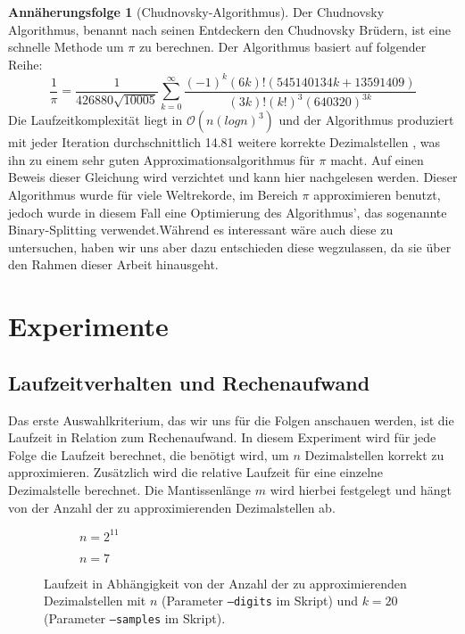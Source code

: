 \documentclass{scrartcl}
\theoremstyle{definition}
\newtheorem{approximation sequence}{Annäherungsfolge}
\begin{document}
\begin{approximation sequence}[Chudnovsky-Algorithmus]
Der Chudnovsky Algorithmus, benannt nach seinen Entdeckern den Chudnovsky
Brüdern, ist eine schnelle Methode um \(\pi\) zu berechnen. Der Algorithmus
basiert auf folgender Reihe\cite{Chudnovsky}:
\[\frac{1}{\pi} = \frac{1}{426880\sqrt{10005}}\sum_{k = 0}^{\infty}\frac{(-1)^k(6k)!(545140134k+13591409)}{(3k)!(k!)^3(640320)^{3k}}\]
Die Laufzeitkomplexität liegt in \(\mathcal{O}(n(logn)^3)\)
  \cite{Runtime-Chudnovsky} und der Algorithmus produziert mit jeder Iteration
  durchschnittlich 14.81 weitere korrekte Dezimalstellen
  \cite{Nachkommastellen-Chudnovsky}, was ihn zu einem sehr guten
  Approximationsalgorithmus für \(\pi\) macht. Auf einen Beweis dieser
  Gleichung wird verzichtet und kann hier \cite{Chudnovsky-Proof} nachgelesen
  werden. Dieser Algorithmus wurde für viele Weltrekorde, im Bereich \(\pi\)
  approximieren benutzt, jedoch wurde in diesem Fall eine Optimierung des
  Algorithmus', das sogenannte Binary-Splitting
  verwendet\cite{Chudnovsky}.Während es interessant wäre auch diese zu
  untersuchen, haben wir uns aber dazu entschieden diese wegzulassen, da sie
  über den Rahmen dieser Arbeit hinausgeht.

\end{approximation sequence}

\pagebreak

\section{Experimente}

\subsection{Laufzeitverhalten und Rechenaufwand}

Das erste Auswahlkriterium, das wir uns für die Folgen anschauen werden, ist
die Laufzeit in Relation zum Rechenaufwand. In diesem Experiment wird für jede
Folge die Laufzeit berechnet, die benötigt wird, um \(n\) Dezimalstellen
korrekt zu approximieren. Zusätzlich wird die relative Laufzeit für eine
einzelne Dezimalstelle berechnet. Die Mantissenlänge \(m\) wird hierbei
festgelegt und hängt von der Anzahl der zu approximierenden Dezimalstellen ab.

\begin{figure}[H]
    \centering
    \begin{subfigure}{\textwidth}
        \centering
        
        \caption{\(n = 2^{11}\)}
    \end{subfigure}
    \hfill
    \begin{subfigure}{\textwidth}
        \centering
        
        \caption{\(n = 7\)}
    \end{subfigure}
    \caption{%
        Laufzeit in Abhängigkeit von der Anzahl der zu approximierenden
        Dezimalstellen mit \(n\) (Parameter \texttt{--digits} im Skript)
        und \(k = 20\) (Parameter \texttt{--samples} im Skript).
    }
\end{figure}
\end{document}

